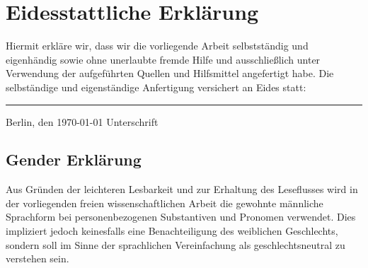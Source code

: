 \chapter*{\LARGE Eidesstattliche Erklärung}
Hiermit erkläre wir, dass wir die vorliegende Arbeit selbstständig und eigenhändig sowie ohne unerlaubte fremde Hilfe und ausschließlich unter Verwendung der aufgeführten Quellen und Hilfsmittel angefertigt habe.\newline
Die selbständige und eigenständige Anfertigung versichert an Eides statt:
\vspace{2em}


\vspace{30 mm}
\begin{flushright}

\rule{90mm}{1pt}

Berlin, den \today \hspace{15 mm} Unterschrift
\end{flushright}

%
\vspace{50 mm}
\section*{\LARGE Gender Erklärung}
Aus Gründen der leichteren Lesbarkeit und zur Erhaltung des Leseflusses wird in der vorliegenden freien wissenschaftlichen Arbeit die gewohnte männliche Sprachform bei personenbezogenen Substantiven und Pronomen verwendet. Dies impliziert jedoch keinesfalls eine Benachteiligung des weiblichen Geschlechts, sondern soll im Sinne der sprachlichen Vereinfachung als geschlechtsneutral zu verstehen sein.